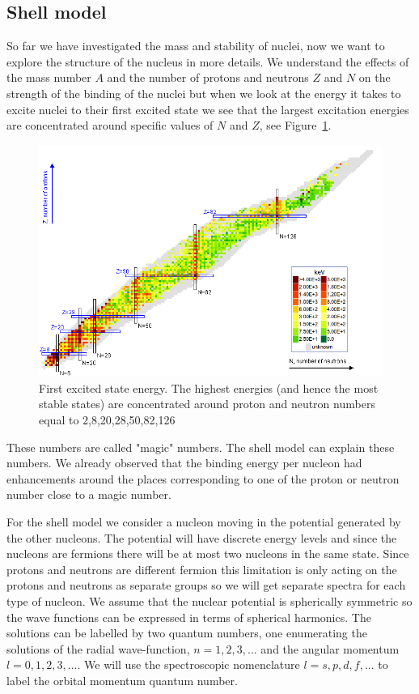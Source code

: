 \documentclass[12pt]{article}
\begin{document}
\subsection{Shell model}
%
%
%
So far we have investigated the mass and stability of nuclei, now we want to explore the structure of the nucleus in more details. We understand the effects of the mass number $A$ and the number of protons and neutrons $Z$ and $N$ on the strength of the binding of the nuclei but when we look at the energy it takes to excite nuclei to their first excited state we see that the largest excitation energies are concentrated around specific values of $N$ and $Z$, see Figure~\ref{fig:firstExcited}.  
\begin{figure}
\begin{center}
\includegraphics[scale=0.4]{images/firstExcitedStateEnergyWithLegend.png}
\end{center}
\caption{First excited state energy. The highest energies (and hence the most stable states) are concentrated around proton and neutron numbers equal to 2,8,20,28,50,82,126}\label{fig:firstExcited}
\end{figure}
These numbers are called "magic" numbers. The shell model can explain these numbers. We already observed that the binding energy per nucleon had enhancements around the places corresponding to one of the proton or neutron number close to a magic number.

For the shell model we consider a nucleon moving in the potential generated by the other nucleons. The potential will have discrete energy levels and since the nucleons are fermions there will be at most two nucleons in the same state. Since protons and neutrons are different fermion this limitation is only acting on the protons and neutrons as separate groups so we will get separate spectra for each type of nucleon. We assume that the nuclear potential is spherically symmetric so the wave functions can be expressed in terms of spherical harmonics. The solutions can be labelled by two quantum numbers, one enumerating the solutions of the radial wave-function, $n=1,2,3,...$ and the angular momentum $l=0,1,2,3,...$. We will use the spectroscopic nomenclature $l=s,p,d,f,...$ to label the orbital momentum quantum number. 
\end{document}
